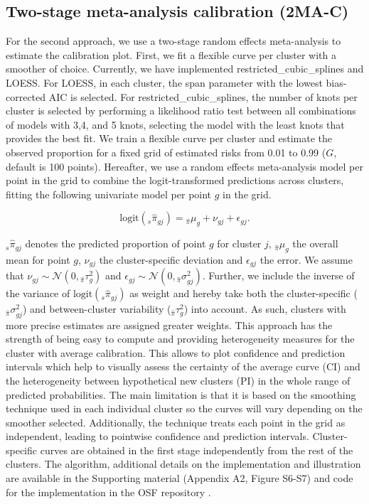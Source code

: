 \subsection{Two-stage meta-analysis calibration (2MA-C)}
For the second approach, we use a two-stage random effects meta-analysis to estimate the calibration plot. First, we fit a flexible curve per cluster with a smoother of choice. Currently, we have implemented \gls{restricted_cubic_splines} and LOESS. For LOESS, in each cluster, the span parameter with the lowest bias-corrected AIC is selected. For \gls{restricted_cubic_splines}, the number of knots per cluster is selected by performing a likelihood ratio test between all combinations of models with 3,4, and 5 knots, selecting the model with the least knots that provides the best fit. We train a flexible curve per cluster and estimate the observed proportion for a fixed grid of estimated risks from 0.01 to 0.99 (\(G\), default is 100 points). Hereafter, we use a random effects meta-analysis model per point in the grid to combine the logit-transformed predictions across clusters, fitting the following univariate model per point \(g\) in the grid.

\[\text{logit}({}_{s}\widehat{\pi}_{gj}) = {}_{\widehat{\pi}}\mu_{g} + \nu_{gj} + \epsilon_{gj}.\]

\({}_{s}\widehat{\pi}_{gj}\) denotes the predicted proportion of point \(g\) for cluster \(j\), \({}_{\widehat{\pi}}\mu_{g}\) the overall mean for point \(g\), \(\nu_{gj}\) the cluster-specific deviation and \(\epsilon_{gj}\) the error. We assume that \(\nu_{gj} \sim \mathcal{N}\left( 0, {}_{\widehat{\pi}}\tau_{g}^{2} \right)\) and \(\epsilon_{gj} \sim \mathcal{N}\left( 0, {}_{\widehat{\pi}}\sigma_{gj}^{2} \right)\). Further, we include the inverse of the variance of \(\text{logit}({}_{s}\widehat{\pi}_{gj})\) as weight and hereby take both the cluster-specific (\({}_{\widehat{\pi}}\sigma_{gj}^{2}\)) and between-cluster variability (\({}_{\widehat{\pi}}\tau_{g}^{2}\)) into account. As such, clusters with more precise estimates are assigned greater weights. This approach has the strength of being easy to compute and providing heterogeneity measures for the cluster with average calibration. This allows to plot confidence and prediction intervals which help to visually assess the certainty of the average curve (\gls{CI}) and the heterogeneity between hypothetical new clusters (\gls{PI}) in the whole range of predicted probabilities. The main limitation is that it is based on the smoothing technique used in each individual cluster so the curves will vary depending on the smoother selected. Additionally, the technique treats each point in the grid as independent, leading to pointwise confidence and prediction intervals. Cluster-specific curves are obtained in the first stage independently from the rest of the clusters. The algorithm, additional details on the implementation and illustration are available in the Supporting material (Appendix A2, Figure S6-S7) and code for the implementation in the \gls{OSF} repository \cite{barrenadaOSFClusteredFlexible2024}.

